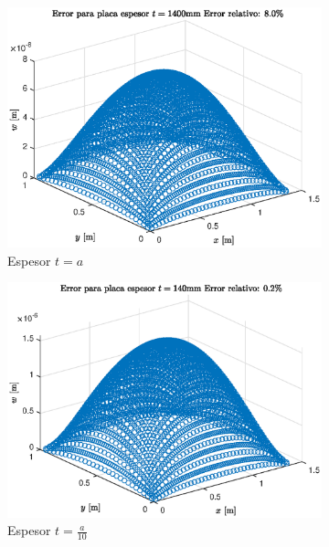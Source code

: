 \documentclass[onecolumn,10pt,titlepage]{article}
\begin{document}
 \begin{figure}[htb!]
 \centering
 \begin{subfigure}{.33\textwidth}
   \centering
   \includegraphics[width=\linewidth]{fig/t1_Error.eps}
   \caption{Espesor $t=a$}
   \label{fig:Minderrort1}
 \end{subfigure}%
 \begin{subfigure}{.33\textwidth}
   \centering
   \includegraphics[width=\linewidth]{fig/t10_Error.eps}
   \caption{Espesor $t=\frac{a}{10}$}
   \label{fig:Minderrort10}
 \end{subfigure}
 \begin{subfigure}{.33\textwidth}
   \centering

\end{subfigure}
\end{figure}
\end{document}
